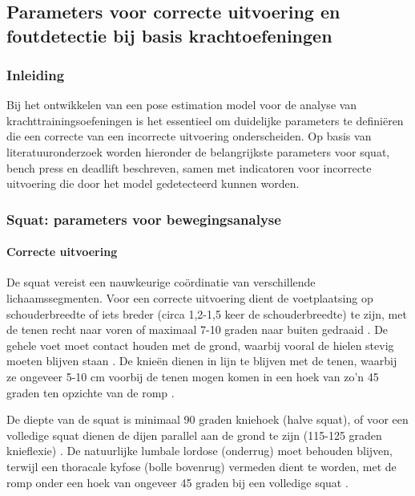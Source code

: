 \chapter{}%
\label{ch:selectie}

\section{Parameters voor correcte uitvoering en foutdetectie bij basis krachtoefeningen}

\subsection{Inleiding}
Bij het ontwikkelen van een pose estimation model voor de analyse van krachttrainingsoefeningen is het essentieel om duidelijke parameters te definiëren die een correcte van een incorrecte uitvoering onderscheiden. 
Op basis van literatuuronderzoek worden hieronder de belangrijkste parameters voor squat, bench press en deadlift beschreven, samen met indicatoren voor incorrecte uitvoering die door het model gedetecteerd kunnen worden.

\subsection{Squat: parameters voor bewegingsanalyse}

\subsubsection{Correcte uitvoering}
De squat vereist een nauwkeurige coördinatie van verschillende lichaamssegmenten. 
Voor een correcte uitvoering dient de voetplaatsing op schouderbreedte of iets breder (circa 1,2-1,5 keer de schouderbreedte) te zijn, met de tenen recht naar voren of maximaal 7-10 graden naar buiten gedraaid \autocite{LorenzettiEtAl2018}. 
De gehele voet moet contact houden met de grond, waarbij vooral de hielen stevig moeten blijven staan \autocite{CzaprowskiEtAl2012}. 
De knieën dienen in lijn te blijven met de tenen, waarbij ze ongeveer 5-10 cm voorbij de tenen mogen komen in een hoek van zo'n 45 graden ten opzichte van de romp \autocite{LorenzettiEtAl2018}.

De diepte van de squat is minimaal 90 graden kniehoek (halve squat), of voor een volledige squat dienen de dijen parallel aan de grond te zijn (115-125 graden knieflexie) \autocite{ComfortEtAl2018}. 
De natuurlijke lumbale lordose (onderrug) moet behouden blijven, terwijl een thoracale kyfose (bolle bovenrug) vermeden dient te worden, met de romp onder een hoek van ongeveer 45 graden bij een volledige squat \autocite{CzaprowskiEtAl2012}.

